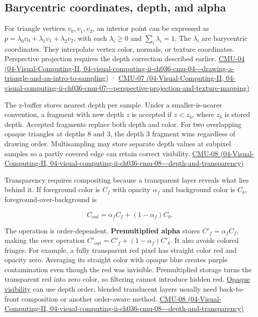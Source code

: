 \subsection{Barycentric coordinates, depth, and alpha}\label{03-visual-computing-i-ch015-barycentric-coordinates-depth-and-alpha}

For triangle vertices \(v_0,v_1,v_2\), an interior point can be expressed as \(p=\lambda_0v_0+\lambda_1v_1+\lambda_2v_2\), with each \(\lambda_i\ge0\) and \(\sum_i\lambda_i=1\). The \(\lambda_i\) are barycentric coordinates. They interpolate vertex color, normals, or texture coordinates. Perspective projection requires the depth correction described earlier. \href{../04-Visual-Computing-II/main.pdf\#nameddest=04-visual-computing-ii-ch036-cmu-04---drawing-a-triangle-and-an-intro-to-sampling}{CMU-04 (04-Visual-Computing-II, 04-visual-computing-ii-ch036-cmu-04-\/-\/-drawing-a-triangle-and-an-intro-to-sampling)} · \href{../04-Visual-Computing-II/main.pdf\#nameddest=04-visual-computing-ii-ch036-cmu-07---perspective-projection-and-texture-mapping}{CMU-07 (04-Visual-Computing-II, 04-visual-computing-ii-ch036-cmu-07-\/-\/-perspective-projection-and-texture-mapping)}

The z-buffer stores nearest depth per sample. Under a smaller-is-nearer convention, a fragment with new depth \(z\) is accepted if \(z<z_b\), where \(z_b\) is stored depth. Accepted fragments replace both depth and color. For two overlapping opaque triangles at depths 8 and 3, the depth 3 fragment wins regardless of drawing order. Multisampling may store separate depth values at subpixel samples so a partly covered edge can retain correct visibility. \href{../04-Visual-Computing-II/main.pdf\#nameddest=04-visual-computing-ii-ch036-cmu-08---depth-and-transparency}{CMU-08 (04-Visual-Computing-II, 04-visual-computing-ii-ch036-cmu-08-\/-\/-depth-and-transparency)}

Transparency requires compositing because a transparent layer reveals what lies behind it. If foreground color is \(C_f\) with opacity \(\alpha_f\) and background color is \(C_b\), foreground-over-background is

\[
C_{out}=\alpha_fC_f+(1-\alpha_f)C_b.
\]

The operation is order-dependent. \textbf{Premultiplied alpha} stores \(C'_f=\alpha_fC_f\), making the over operation \(C'_{out}=C'_f+(1-\alpha_f)C'_b\). It also avoids colored fringes. For example, a fully transparent red pixel has straight color red and opacity zero. Averaging its straight color with opaque blue creates purple contamination even though the red was invisible. Premultiplied storage turns the transparent red into zero color, so filtering cannot introduce hidden red. \hyperref[appendix-97578ed97952]{Opaque visibility} can use depth order; blended translucent layers usually need back-to-front composition or another order-aware method. \href{../04-Visual-Computing-II/main.pdf\#nameddest=04-visual-computing-ii-ch036-cmu-08---depth-and-transparency}{CMU-08 (04-Visual-Computing-II, 04-visual-computing-ii-ch036-cmu-08-\/-\/-depth-and-transparency)}

